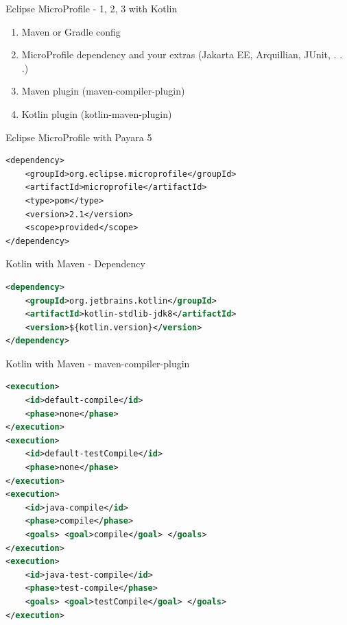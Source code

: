 \documentclass[aspectratio=169]{beamer}
\begin{document}
\begin{frame}{Eclipse MicroProfile - 1, 2, 3 with Kotlin}
\begin{enumerate}
	\item Maven or Gradle config
	\item MicroProfile dependency and your extras (Jakarta EE, Arquillian, JUnit, . . .)
	\item Maven plugin (maven-compiler-plugin)
	\item Kotlin plugin (kotlin-maven-plugin)
\end{enumerate}
\end{frame}

\begin{frame}[fragile]{Eclipse MicroProfile with Payara 5}
\begin{lstlisting}
<dependency>
    <groupId>org.eclipse.microprofile</groupId>
    <artifactId>microprofile</artifactId>
    <type>pom</type>
    <version>2.1</version>
    <scope>provided</scope>
</dependency>
\end{lstlisting}
\end{frame}


\begin{frame}[fragile]{Kotlin with Maven - Dependency}
\begin{lstlisting}[language=XML]
<dependency>
    <groupId>org.jetbrains.kotlin</groupId>
    <artifactId>kotlin-stdlib-jdk8</artifactId>
    <version>${kotlin.version}</version>
</dependency>
\end{lstlisting}
\end{frame}

\begin{frame}[fragile]{Kotlin with Maven - maven-compiler-plugin}
\begin{lstlisting}[language=xml,
basicstyle=\tiny\ttfamily
]
<execution>
    <id>default-compile</id>
    <phase>none</phase>
</execution>
<execution>
    <id>default-testCompile</id>
    <phase>none</phase>
</execution>
<execution>
    <id>java-compile</id>
    <phase>compile</phase>
    <goals> <goal>compile</goal> </goals>
</execution>
<execution>
    <id>java-test-compile</id>
    <phase>test-compile</phase>
    <goals> <goal>testCompile</goal> </goals>
</execution>
\end{lstlisting}
\end{frame}
\end{document}
